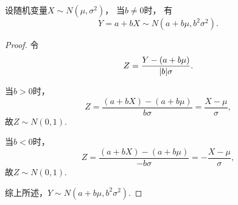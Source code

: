 \begin{proposition}\label{theorem:正态分布与自然指数分布族.正态分布的线性性质}
设随机变量\(X \sim N(\mu,\sigma^2)\)，
当\(b \neq 0\)时，
有\begin{equation}
	Y = a+bX \sim N(a+b\mu,b^2\sigma^2).
\end{equation}
\begin{proof}
令\begin{equation*}
	Z = \frac{Y-(a+b\mu)}{\abs{b}\sigma}.
\end{equation*}

当\(b > 0\)时，\begin{equation*}
	Z = \frac{(a+bX)-(a+b\mu)}{b\sigma}=\frac{X-\mu}{\sigma},
\end{equation*}
故\(Z \sim N(0,1)\).

当\(b < 0\)时，\begin{equation*}
Z = \frac{(a+bX)-(a+b\mu)}{-b\sigma}=-\frac{X-\mu}{\sigma},
\end{equation*}
故\(Z \sim N(0,1)\).

综上所述，\(Y \sim N(a+b\mu,b^2\sigma^2)\).
\end{proof}
\end{proposition}
